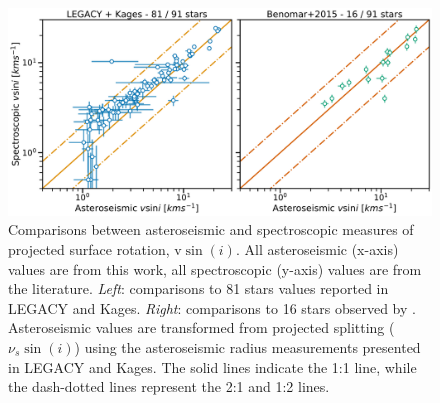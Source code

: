  
 \begin{figure}[h!]
 	\centering
 	\includegraphics[width=\textwidth]{Images/vsini-comparison.pdf}
 	\caption{Comparisons between asteroseismic and spectroscopic measures of projected surface rotation, $\textrm{v}\sin(i)$. All asteroseismic (x-axis) values are from this work, all spectroscopic (y-axis) values are from the literature. \textit{Left}: comparisons to 81 stars values reported in LEGACY and Kages. \textit{Right}: comparisons to 16 stars observed by \cite{benomar+2015}. Asteroseismic values are transformed from projected splitting ($\nu_s\sin(i)$) using the asteroseismic radius measurements presented in LEGACY and Kages. The solid lines indicate the 1:1 line, while the dash-dotted lines represent the 2:1 and 1:2 lines.}
 	\label{fig:vsinilit}
 \end{figure}

%
 